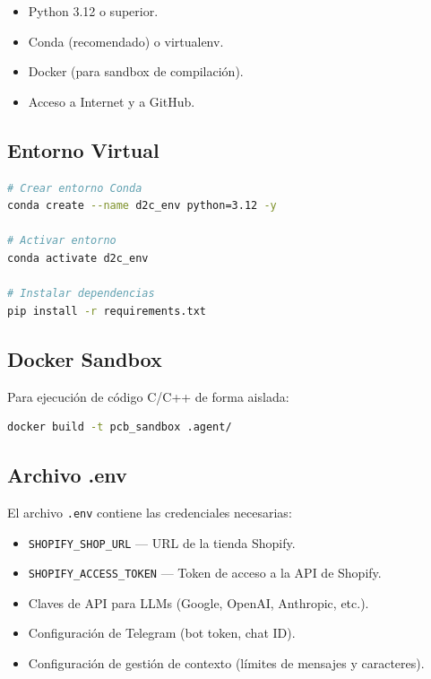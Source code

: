 \documentclass[a4paper,12pt]{article}
\begin{document}
\begin{itemize}
    \item Python 3.12 o superior.
    \item Conda (recomendado) o virtualenv.
    \item Docker (para sandbox de compilación).
    \item Acceso a Internet y a GitHub.
\end{itemize}

\subsection{Entorno Virtual}

\begin{lstlisting}[language=bash]
# Crear entorno Conda
conda create --name d2c_env python=3.12 -y

# Activar entorno
conda activate d2c_env

# Instalar dependencias
pip install -r requirements.txt
\end{lstlisting}

\subsection{Docker Sandbox}

Para ejecución de código C/C++ de forma aislada:

\begin{lstlisting}[language=bash]
docker build -t pcb_sandbox .agent/
\end{lstlisting}

\subsection{Archivo .env}

El archivo \texttt{.env} contiene las credenciales necesarias:

\begin{itemize}
    \item \texttt{SHOPIFY\_SHOP\_URL} --- URL de la tienda Shopify.
    \item \texttt{SHOPIFY\_ACCESS\_TOKEN} --- Token de acceso a la API de Shopify.
    \item Claves de API para LLMs (Google, OpenAI, Anthropic, etc.).
    \item Configuración de Telegram (bot token, chat ID).
    \item Configuración de gestión de contexto (límites de mensajes y caracteres).
\end{itemize}
\end{document}
